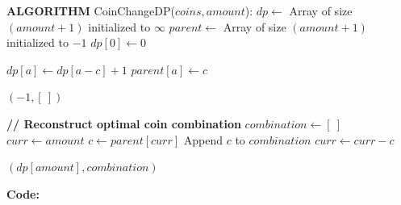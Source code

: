 \documentclass[12pt]{article}
\begin{document}
\begin{algorithm}[H]
\caption{CoinChangeDP}
\begin{algorithmic}[1]
\State \textbf{ALGORITHM} CoinChangeDP($coins, amount$):
    \State $dp \gets$ Array of size $(amount + 1)$ initialized to $\infty$
    \State $parent \gets$ Array of size $(amount + 1)$ initialized to $-1$
    \State $dp[0] \gets 0$

                \State $dp[a] \gets dp[a - c] + 1$
                \State $parent[a] \gets c$
            \EndIf
        \EndFor
    \EndFor

        \State \Return $(-1, [\ ])$
    \EndIf

    \State \textbf{// Reconstruct optimal coin combination}
    \State $combination \gets [\ ]$
    \State $curr \gets amount$
        \State $c \gets parent[curr]$
        \State Append $c$ to $combination$
        \State $curr \gets curr - c$
    \EndWhile

    \State \Return $(dp[amount], combination)$
\end{algorithmic}
\end{algorithm}

\newpage
\textbf{Code:}
\end{document}
